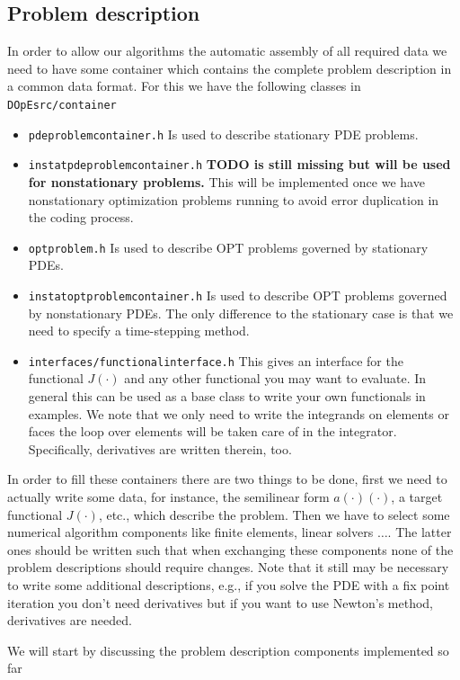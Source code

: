 \documentclass[prodmode,acmtoms]{acmsmall}
\numberwithin{equation}{section}
\begin{document}
\subsection{Problem description}
In order to allow our algorithms the automatic assembly of all required 
data we need to have some container which contains the complete problem 
description in a common data format. For this we have the following 
classes in \texttt{DOpEsrc/container}
\begin{itemize}
  \item \texttt{pdeproblemcontainer.h} Is used to describe  stationary PDE problems.
  \item \texttt{instatpdeproblemcontainer.h} {\bf TODO is still missing but will be used for nonstationary problems.} This will be implemented once we have nonstationary optimization problems running to avoid error duplication in the coding process.
  \item \texttt{optproblem.h} Is used to describe  OPT problems governed by 
    stationary PDEs. 
  \item \texttt{instatoptproblemcontainer.h} Is used to describe  OPT problems
    governed by nonstationary PDEs. The only difference to the stationary case
    is that we need to specify a time-stepping method.  
  \item \texttt{interfaces/functionalinterface.h} This gives an interface 
    for the functional $J(\cdot)$ and any other functional you may want to evaluate.
    In general this can be used as a base class to write your own functionals 
    in examples. We note that we only need to write the integrands on 
    elements or faces the loop over elements will be taken care of in the integrator.
    Specifically, derivatives are written therein, too.
\end{itemize}
In order to fill these containers there are two things to be done,
first we need to actually write some data, for instance,
the semilinear form $a(\cdot)(\cdot)$, a target functional $J(\cdot)$, etc.,
which describe the problem. Then we have to select some numerical 
algorithm components like finite elements, linear solvers $\ldots$.
The latter ones should be written such that when exchanging these components
none of the problem descriptions should require changes. 
Note that it still may be necessary to write some additional descriptions, 
e.g., if you solve the PDE with a fix point iteration you don't need derivatives
but if you want to use Newton's method, derivatives are needed.

We will start by discussing the problem description components implemented so far
\end{document}
